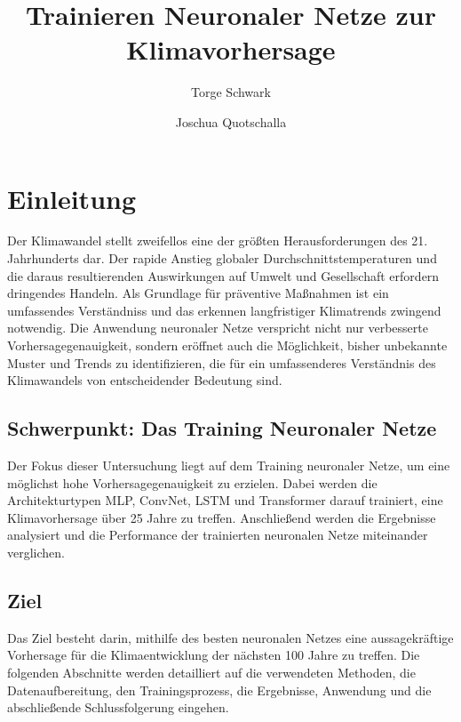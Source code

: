 \documentclass[acmtog, authorversion]{acmart} %
\begin{document}
\title{Trainieren Neuronaler Netze zur Klimavorhersage}

\author{Torge Schwark}
\author{Joschua Quotschalla}
\authornotemark[1]


\maketitle

\section{Einleitung}
Der Klimawandel stellt zweifellos eine der größten Herausforderungen des 21. Jahrhunderts dar. Der rapide Anstieg globaler Durchschnittstemperaturen und die daraus resultierenden Auswirkungen auf Umwelt und Gesellschaft erfordern dringendes Handeln. Als Grundlage für präventive Maßnahmen ist ein umfassendes Verständniss und das erkennen langfristiger Klimatrends zwingend notwendig. 
Die Anwendung neuronaler Netze verspricht nicht nur verbesserte Vorhersagegenauigkeit, sondern eröffnet auch die Möglichkeit, bisher unbekannte Muster und Trends zu identifizieren, die für ein umfassenderes Verständnis des Klimawandels von entscheidender Bedeutung sind.

\subsection{Schwerpunkt: Das Training Neuronaler Netze}
Der Fokus dieser Untersuchung liegt auf dem Training neuronaler Netze, um eine möglichst hohe Vorhersagegenauigkeit zu erzielen. Dabei werden die Architekturtypen MLP, ConvNet, LSTM und Transformer darauf trainiert, eine Klimavorhersage über 25 Jahre zu treffen. Anschließend werden die Ergebnisse analysiert und die Performance der trainierten neuronalen Netze miteinander verglichen. 

\subsection{Ziel}
Das Ziel besteht darin, mithilfe des besten neuronalen Netzes eine aussagekräftige Vorhersage für die Klimaentwicklung der nächsten 100 Jahre zu treffen.
Die folgenden Abschnitte werden detailliert auf die verwendeten Methoden, die Datenaufbereitung, den Trainingsprozess, die Ergebnisse, Anwendung und die abschließende Schlussfolgerung eingehen.
\end{document}
